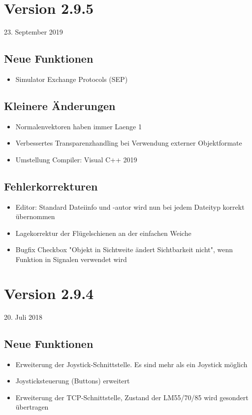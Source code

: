 \section{Version 2.9.5}\hfill 23. September 2019
\subsection{Neue Funktionen}
\begin{itemize}
    \item Simulator Exchange Protocols (SEP)
\end{itemize}


\subsection{Kleinere Änderungen}
\begin{itemize}
\item Normalenvektoren haben immer Laenge 1
\item Verbessertes Transparenzhandling bei Verwendung externer Objektformate
\item Umstellung Compiler: Visual C++ 2019
\end{itemize}

\subsection{Fehlerkorrekturen}
\begin{itemize}
\item Editor: Standard Dateiinfo und -autor wird nun bei jedem Dateityp korrekt übernommen
\item Lagekorrektur der Flügelschienen an der einfachen Weiche
\item Bugfix Checkbox "Objekt in Sichtweite ändert Sichtbarkeit nicht", wenn Funktion in Signalen verwendet wird
\end{itemize}


\section{Version 2.9.4}\hfill 20. Juli 2018
\subsection{Neue Funktionen}
\begin{itemize}
\item Erweiterung der Joystick-Schnittstelle. Es sind mehr als ein Joystick möglich
\item Joysticksteuerung (Buttons) erweitert
\item Erweiterung der TCP-Schnittstelle, Zustand der LM55/70/85 wird gesondert übertragen
\end{itemize}


